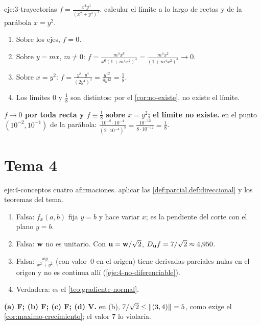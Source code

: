 \begin{solucion}{eje:3-trayectorias}
\datos $f=\frac{x^4y^4}{(x^2+y^4)^3}$.
\planteamiento calcular el límite a lo largo de rectas y de la parábola $x=y^2$.
\pasos
\begin{enumerate}[label=\arabic*.]
  \item Sobre los ejes, $f=0$.
  \item Sobre $y=mx$, $m\neq0$: $f=\frac{m^4x^8}{x^6(1+m^4x^2)^3}=\frac{m^4x^2}{(1+m^4x^2)^3}\to0$.
  \item Sobre $x=y^2$: $f=\frac{y^8\cdot y^4}{(2y^4)^3}=\frac{y^{12}}{8y^{12}}=\frac18$.
  \item Los límites $0$ y $\frac18$ son distintos: por el \cref{cor:no-existe}, no existe el límite.
\end{enumerate}
\resultado \textbf{$f\to0$ por toda recta y $f\equiv\frac18$ sobre $x=y^2$; el límite no existe.}
\comprobacion en el punto $(10^{-2},10^{-1})$ de la parábola: $\frac{10^{-8}\cdot10^{-4}}{(2\cdot10^{-4})^3}=\frac{10^{-12}}{8\cdot10^{-12}}=\frac18$.
\end{solucion}

\section{Tema 4}

\begin{solucion}{eje:4-conceptos}
\datos cuatro afirmaciones.
\planteamiento aplicar las \cref{def:parcial,def:direccional} y los teoremas del tema.
\pasos
\begin{enumerate}[label=(\alph*)]
  \item Falsa: $f_x(a,b)$ fija $y=b$ y hace variar $x$; es la pendiente del corte con el plano $y=b$.
  \item Falsa: $\mathbf{w}$ no es unitario. Con $\mathbf{u}=\mathbf{w}/\sqrt2$, $D_{\mathbf{u}}f=7/\sqrt2\approx4{,}950$.
  \item Falsa: $\frac{xy}{x^2+y^2}$ (con valor~0 en el origen) tiene derivadas parciales nulas en el origen y no es continua allí (\cref{eje:4-no-diferenciable}).
  \item Verdadera: es el \cref{teo:gradiente-normal}.
\end{enumerate}
\resultado \textbf{(a) F; (b) F; (c) F; (d) V.}
\comprobacion en (b), $7/\sqrt2\le\lVert(3,4)\rVert=5$, como exige el \cref{cor:maximo-crecimiento}; el valor $7$ lo violaría.
\end{solucion}

